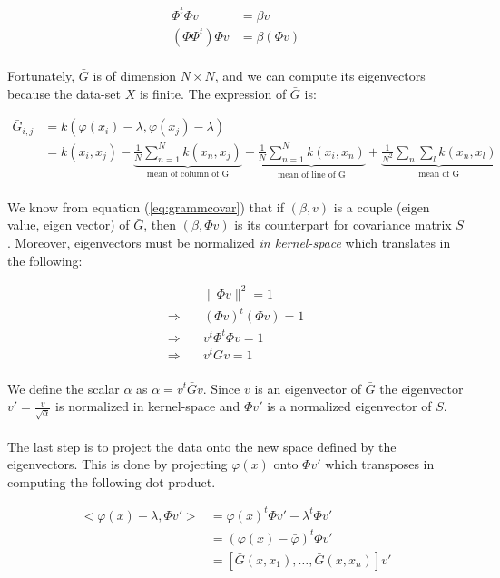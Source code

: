\begin{align}\label{eq:grammcovar} \Phi^t\Phi v &= \beta v \\ (\Phi\Phi^t)\Phi v &= \beta (\Phi
v) \end{align}

\paragraph{} Fortunately, $\bar{G}$ is of dimension $N \times N$, and we can compute its
eigenvectors because the data-set $X$ is finite. The expression of $\bar{G}$ is:

\begin{align*} \bar{G}_{i, j} &= k(\varphi(x_i) - \lambda, \varphi(x_j) - \lambda) \\ &=
k(x_i, x_j) - \underbrace{\frac{1}{N}\sum_{n = 1}^N k(x_n, x_j)}_{\text{mean of column of G}} -
\underbrace{\frac{1}{N}\sum_{n = 1}^N k(x_i, x_n)}_{\text{mean of line of G}} +
\underbrace{\frac{1}{N^2}\sum_n\sum_l k(x_n, x_l)}_{\text{mean of G}} \end{align*}

\paragraph{} We know from equation (\ref{eq:grammcovar}) that if $(\beta, v)$ is a couple (eigen
value, eigen vector) of $\bar{G}$, then $(\beta, \Phi v)$ is its counterpart for covariance matrix
$S$. Moreover, eigenvectors must be normalized \emph{in kernel-space} which translates in the
following:

\begin{align*} &\| \Phi v \|^2 = 1 \\ \Rightarrow\quad &(\Phi v)^t(\Phi v) = 1 \\ \Rightarrow\quad
&v^t\Phi^t\Phi v = 1 \\ \Rightarrow\quad &v^t \bar{G} v = 1 \end{align*}

\paragraph{} We define the scalar $\alpha$ as $\alpha = v^t \bar{G} v$. Since $v$ is an eigenvector
of $\bar{G}$ the eigenvector $v' = \frac{v}{\sqrt{\alpha}}$ is normalized in kernel-space and $\Phi
v'$ is a normalized eigenvector of $S$.


\paragraph{} The last step is to project the data onto the new space defined by the eigenvectors.
This is done by projecting $\varphi(x)$ onto $\Phi v'$ which transposes in computing the following
dot product.

\begin{align*} <\varphi(x) - \lambda, \Phi v'> &= \varphi(x)^t\Phi v' - \lambda^t\Phi v'
\\ &= (\varphi(x) - \bar{\varphi})^t\Phi v' \\ &= [\bar{G}(x, x_1), \ldots, \bar{G}(x, x_n)] v'
\end{align*}

